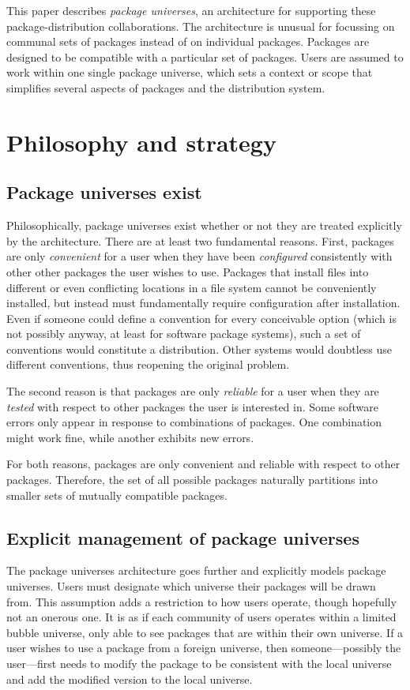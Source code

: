 \documentclass{article}
\begin{document}
This paper describes \emph{package universes}, an architecture for
supporting these package-distribution collaborations.  The
architecture is unusual for focussing on communal sets of packages
instead of on individual packages.  Packages are designed to be
compatible with a particular set of packages.  Users are assumed to
work within one single package universe, which sets a context or scope
that simplifies several aspects of packages and the distribution
system.


\section{Philosophy and strategy}

\subsection{Package universes exist}
Philosophically, package universes exist whether or not they are
treated explicitly by the architecture.  There are at least two
fundamental reasons.  First, packages are only \emph{convenient} for a
user when they have been \emph{configured} consistently with other
other packages the user wishes to use.  Packages that install files
into different or even conflicting locations in a file system cannot be
conveniently installed, but instead must fundamentally require
configuration after installation.  Even if someone could define a
convention for every conceivable option (which is not possibly anyway,
at least for software package systems), such a set of conventions
would constitute a distribution.  Other systems would doubtless use
different conventions, thus reopening the original problem.

The second reason is that packages are only \emph{reliable} for a user
when they are \emph{tested} with respect to other packages the user is
interested in.  Some software errors only appear in response to
combinations of packages.  One combination might work fine, while
another exhibits new errors.

For both reasons, packages are only convenient and reliable with
respect to other packages.  Therefore, the set of all possible
packages naturally partitions into smaller sets of mutually compatible
packages.


\subsection{Explicit management of package universes}
The package universes architecture goes further and explicitly models
package universes.  Users must designate which universe their packages
will be drawn from.  This assumption adds a restriction to how users
operate, though hopefully not an onerous one.  It is as if each
community of users operates within a limited bubble universe, only
able to see packages that are within their own universe.  If a user
wishes to use a package from a foreign universe, then
someone---possibly the user---first needs to modify the package to be
consistent with the local universe and add the modified version to the
local universe.
\end{document}
